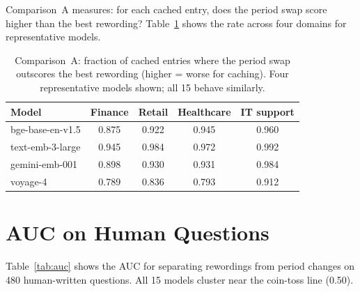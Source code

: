 \documentclass[11pt,a4paper]{article}
\begin{document}
Comparison~A measures: for each cached entry, does the period swap score
higher than the best rewording? Table~\ref{tab:comp-a} shows the rate
across four domains for representative models.

\begin{table}[h]
\centering
\caption{Comparison~A: fraction of cached entries where the period swap
outscores the best rewording (higher = worse for caching). Four
representative models shown; all 15 behave similarly.}
\label{tab:comp-a}
\small
\begin{tabular}{@{}lcccc@{}}
\toprule
Model & Finance & Retail & Healthcare & IT support \\
\midrule
bge-base-en-v1.5    & 0.875 & 0.922 & 0.945 & 0.960 \\
text-emb-3-large    & 0.945 & 0.984 & 0.972 & 0.992 \\
gemini-emb-001      & 0.898 & 0.930 & 0.931 & 0.984 \\
voyage-4            & 0.789 & 0.836 & 0.793 & 0.912 \\
\bottomrule
\end{tabular}
\end{table}

\section{AUC on Human Questions}
\label{app:auc}

Table~\ref{tab:auc} shows the AUC for separating rewordings from period
changes on 480 human-written questions. All 15 models cluster near the
coin-toss line (0.50).
\end{document}
